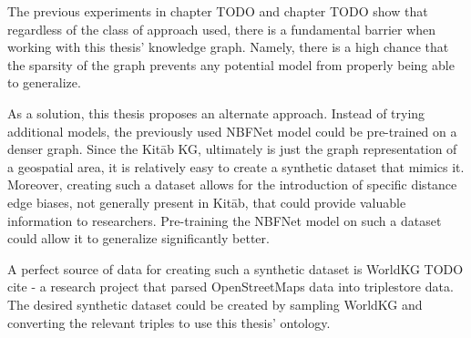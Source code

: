 The previous experiments in chapter TODO and chapter TODO show that regardless of the class of approach used,
there is a fundamental barrier when working with this thesis' knowledge graph.
Namely, there is a high chance that the sparsity of the graph prevents
any potential model from properly being able to generalize.

As a solution, this thesis proposes an alternate approach.
Instead of trying additional models, the previously used
NBFNet model could be pre-trained on a denser graph.
Since the Kitāb KG, ultimately is just the graph representation of a geospatial area,
it is relatively easy to create a synthetic dataset that mimics it.
Moreover, creating such a dataset allows for the introduction of specific distance edge biases, not generally present in Kitāb, that could provide valuable information to researchers.
Pre-training the NBFNet model on such a dataset could allow it to generalize significantly better.

A perfect source of data for creating such a synthetic dataset is WorldKG TODO cite - a research project that parsed OpenStreetMaps data into triplestore data.
The desired synthetic dataset could be created by sampling WorldKG and converting the relevant triples to use this thesis' ontology.